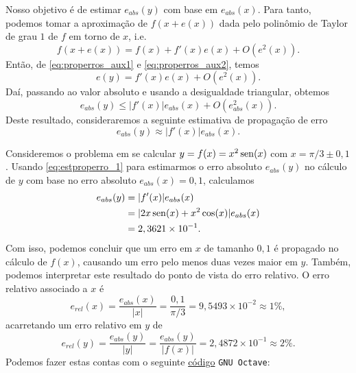 Nosso objetivo é de estimar $e_{abs}(y)$ com base em $e_{abs}(x)$. Para tanto, podemos tomar a aproximação de $f(x+e(x))$ dada pelo polinômio de Taylor de grau $1$ de $f$ em torno de $x$, i.e.
\begin{equation}
  f(x+e(x)) = f(x) + f'(x)e(x) + O\left(e^2(x)\right).
\end{equation}
Então, de \eqref{eq:properros_aux1} e \eqref{eq:properros_aux2}, temos
\begin{equation}
  e(y) = f'(x)e(x) + O(e^2(x)).
\end{equation}
Daí, passando ao valor absoluto e usando a desigualdade triangular, obtemos
\begin{equation}
  e_{abs}(y) \leq |f'(x)|e_{abs}(x) + O\left(e_{abs}^2(x)\right).
\end{equation}
Deste resultado, consideraremos a seguinte estimativa de propagação de erro
\begin{equation}\label{eq:estproperro_1}
  e_{abs}(y) \approx |f'(x)|e_{abs}(x).
\end{equation}

\begin{ex}\label{ex:properro_1}
  Consideremos o problema em se calcular $y = f(x) = x^2\operatorname{sen}(x)$ com $x=\pi/3 \pm 0,1$. Usando \eqref{eq:estproperro_1} para estimarmos o erro absoluto $e_{abs}(y)$ no cálculo de $y$ com base no erro absoluto $e_{abs}(x)=0,1$, calculamos
  \begin{align}
    e_{abs}(y) &= |f'(x)|e_{abs}(x)\\
             &= |2x\operatorname{sen}(x) + x^2\cos(x)|e_{abs}(x)\\
             &= 2,3621\times 10^{-1}.
  \end{align}
Com isso, podemos concluir que um erro em $x$ de tamanho $0,1$ é propagado no cálculo de $f(x)$, causando um erro pelo menos duas vezes maior em $y$. Também, podemos interpretar este resultado do ponto de vista do erro relativo. O erro relativo associado a $x$ é
\begin{equation}
  e_{rel}(x) = \frac{e_{abs}(x)}{|x|} = \frac{0,1}{\pi/3} = 9,5493\times 10^{-2} \approx 1\%,
\end{equation}
acarretando um erro relativo em $y$ de
\begin{equation}
  e_{rel}(y) = \frac{e_{abs}(y)}{|y|} = \frac{e_{abs}(y)}{|f(x)|} = 2,4872\times 10^{-1} \approx 2\%.
\end{equation}
\ifisoctave
Podemos fazer estas contas com o seguinte \href{https://github.com/phkonzen/notas/blob/master/src/MatematicaNumerica/cap_aritm/dados/ex_properro_1/ex_properro_1.m}{código} \verb+GNU Octave+:

\fi
\end{ex}

